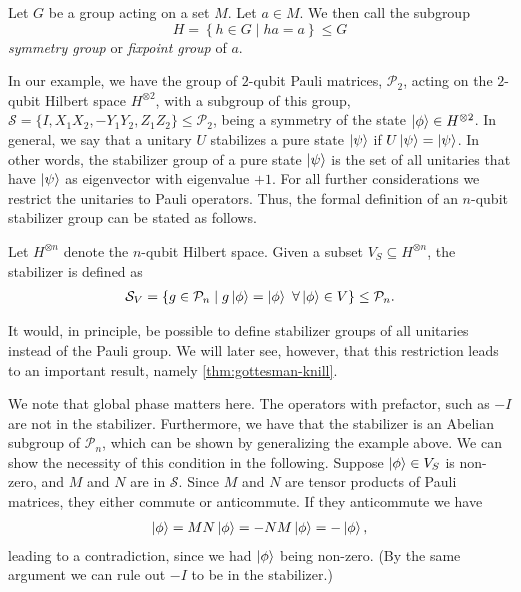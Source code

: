 \begin{defn}\label{defn:fixpointgroup}
  Let $G$ be a group acting on a set $M$. Let $a\in M$. We then call the
  subgroup
  \[ H = \left\{ h \in G \mid ha = a \right\} \leq G \]
  \emph{symmetry group} or \emph{fixpoint group} of $a$.
\end{defn}

In our example, we have the group of $2$-qubit Pauli matrices, $\mathcal{P}_2$,
acting on the $2$-qubit Hilbert space $H^{\otimes 2}$, with a subgroup of this
group, $\mathcal{S} = \{I, X_1X_2, -Y_1Y_2, Z_1Z_2\} \leq \mathcal{P}_2$, being
a symmetry of the state $\ket{\phi} \in H^{\otimes 2}$.
In general, we say that a unitary $U$ stabilizes a pure state $\ket{\psi}$ if
$U\ket{\psi} = \ket{\psi}$. In other words, the stabilizer group of a pure
state
$\ket{\psi}$ is the set of all unitaries that have $\ket{\psi}$ as eigenvector
with eigenvalue $+1$. For all further considerations we restrict the unitaries
to Pauli operators. Thus, the formal definition of an $n$-qubit stabilizer
group can be stated as follows.

\begin{defn}\label{defn:stabilizergroup}
  Let $H^{\otimes n}$ denote the $n$-qubit Hilbert space. Given a subset $V_S
  \subseteq H^{\otimes n}$, the stabilizer is defined as
  \begin{align}
    \mathcal{S}_V = \{ g \in \mathcal{P}_n \mid g \ket{\phi} = \ket{\phi} \
    \forall \ket{\phi} \in V \} \leq \mathcal{P}_n
  .\end{align}
\end{defn}

It would, in principle, be possible to define stabilizer groups of all
unitaries instead of the Pauli group. We will later see, however, that this
restriction leads to an important result, namely \cref{thm:gottesman-knill}.

We note that global phase matters here. The operators with prefactor, such as
$-I$ are not in the stabilizer. Furthermore, we have that the stabilizer is an
Abelian subgroup of $\mathcal{P}_n$, which can be shown by generalizing the
example above. We can show the necessity of this condition in the following.
Suppose $\ket{\phi}\in V_S$ is non-zero, and $M$ and $N$ are in $\mathcal{S}$. Since $M$
and $N$ are tensor products of Pauli matrices, they either commute or
anticommute. If they anticommute we have
\begin{align}
  \ket{\phi} = MN\ket{\phi} = -NM\ket{\phi} = -\ket{\phi}
,\end{align}
leading to a contradiction, since we had $\ket{\phi}$ being non-zero. (By the
same argument we can rule out $-I$ to be in the stabilizer.)


